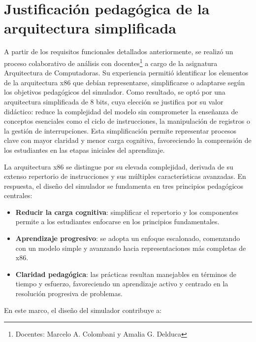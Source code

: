 \documentclass[12pt,oneside]{templates/unerthesis}
\providecommand{\tightlist}{%
  \setlength{\itemsep}{0pt}\setlength{\parskip}{0pt}}
\begin{document}
\hypertarget{justificaciuxf3n-pedaguxf3gica-de-la-arquitectura-simplificada}{%
\section{Justificación pedagógica de la arquitectura simplificada}\label{justificaciuxf3n-pedaguxf3gica-de-la-arquitectura-simplificada}}

A partir de los requisitos funcionales detallados anteriormente, se realizó un proceso colaborativo de análisis con docentes\footnote{Docentes: Marcelo A. Colombani y Amalia G. Delduca} a cargo de la asignatura Arquitectura de Computadoras. Su experiencia permitió identificar los elementos de la arquitectura x86 que debían representarse, simplificarse o adaptarse según los objetivos pedagógicos del simulador. Como resultado, se optó por una arquitectura simplificada de 8 bits, cuya elección se justifica por su valor didáctico: reduce la complejidad del modelo sin comprometer la enseñanza de conceptos esenciales como el ciclo de instrucciones, la manipulación de registros o la gestión de interrupciones. Esta simplificación permite representar procesos clave con mayor claridad y menor carga cognitiva, favoreciendo la comprensión de los estudiantes en las etapas iniciales del aprendizaje.

La arquitectura x86 se distingue por su elevada complejidad, derivada de su extenso repertorio de instrucciones y sus múltiples características avanzadas. En respuesta, el diseño del simulador se fundamenta en tres principios pedagógicos centrales:

\begin{itemize}
\tightlist
\item
  \textbf{Reducir la carga cognitiva}: simplificar el repertorio y los componentes permite a los estudiantes enfocarse en los principios fundamentales.\\
\item
  \textbf{Aprendizaje progresivo}: se adopta un enfoque escalonado, comenzando con un modelo simple y avanzando hacia representaciones más completas de x86.\\
\item
  \textbf{Claridad pedagógica}: las prácticas resultan manejables en términos de tiempo y esfuerzo, favoreciendo un aprendizaje activo y centrado en la resolución progresiva de problemas.
\end{itemize}

En este marco, el diseño del simulador contribuye a:
\end{document}
